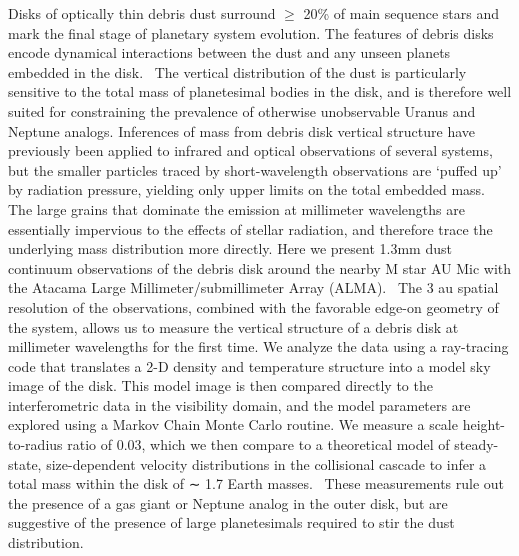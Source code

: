 \documentclass[12 pt, letterpaper]{article}
\begin{document}
\abstract
Disks of optically thin debris dust surround $\geq$ 20\% of main sequence stars and mark the final stage of planetary system evolution. The features of debris disks encode dynamical interactions between the dust and any unseen planets embedded in the disk.  
The vertical distribution of the dust is particularly sensitive to the total mass of planetesimal bodies in the disk, and is therefore well suited for constraining the prevalence of otherwise unobservable Uranus and Neptune analogs. 
Inferences of mass from debris disk vertical structure have previously been applied to infrared and optical observations of several systems, but the smaller particles traced by short-wavelength observations are ‘puffed up’ by radiation pressure, yielding only upper limits on the total embedded mass. 
The large grains that dominate the emission at millimeter wavelengths are essentially impervious to the effects of stellar radiation, and therefore trace the underlying mass distribution more directly. 
Here we present 1.3mm dust continuum observations of the debris disk around the nearby M star AU Mic with the Atacama Large Millimeter/submillimeter Array (ALMA).  
The 3 au spatial resolution of the observations, combined with the favorable edge-on geometry of the system, allows us to measure the vertical structure of a debris disk at millimeter wavelengths for the first time. 
We analyze the data using a ray-tracing code that translates a 2-D density and temperature structure into a model sky image of the disk. This model image is then compared directly to the interferometric data in the visibility domain, and the model parameters are explored using a Markov Chain Monte Carlo routine. We measure a scale height-to-radius ratio of 0.03, which we then compare to a theoretical model of steady-state, size-dependent velocity distributions in the collisional cascade to infer a total mass within the disk of ∼ 1.7 Earth masses.  These measurements rule out the presence of a gas giant or Neptune analog in the outer disk, but are suggestive of the presence of large planetesimals required to stir the dust distribution.
\end{document}
